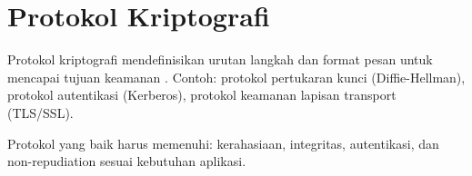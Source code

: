 \section{Protokol Kriptografi}

Protokol kriptografi mendefinisikan urutan langkah dan format pesan untuk mencapai tujuan keamanan \cite{ferguson2010,stallings2017}. Contoh: protokol pertukaran kunci (Diffie-Hellman), protokol autentikasi (Kerberos), protokol keamanan lapisan transport (TLS/SSL).

Protokol yang baik harus memenuhi: kerahasiaan, integritas, autentikasi, dan non-repudiation sesuai kebutuhan aplikasi.
